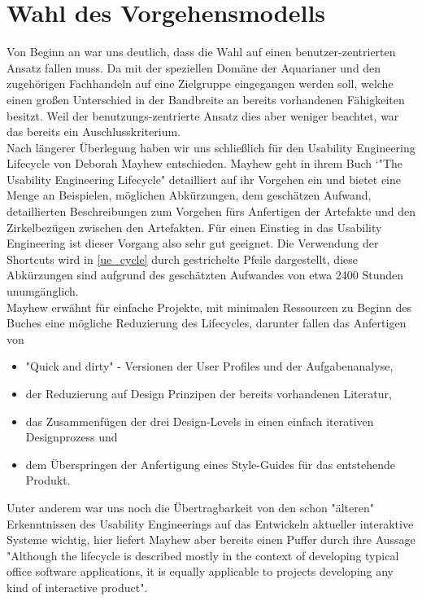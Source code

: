 \chapter{Wahl des Vorgehensmodells}
Von Beginn an war uns deutlich, dass die Wahl auf einen benutzer-zentrierten Ansatz fallen muss. Da mit der speziellen Domäne der Aquarianer und den zugehörigen Fachhandeln auf eine Zielgruppe eingegangen werden soll, welche einen großen Unterschied in der Bandbreite an bereits vorhandenen Fähigkeiten besitzt. Weil der benutzungs-zentrierte Ansatz dies aber weniger beachtet, war das bereits ein Auschlusskriterium.\\
 
Nach längerer Überlegung haben wir uns schließlich für den Usability Engineering Lifecycle von Deborah Mayhew entschieden. Mayhew geht in ihrem Buch `"The Usability Engineering Lifecycle" detailliert auf ihr Vorgehen ein und bietet eine Menge an Beispielen, möglichen Abkürzungen, dem geschätzen Aufwand, detaillierten Beschreibungen zum Vorgehen fürs Anfertigen der Artefakte und den Zirkelbezügen zwischen den Artefakten. Für einen Einstieg in das Usability Engineering ist dieser Vorgang also sehr gut geeignet. 
Die Verwendung der Shortcuts wird in \ref{ue_cycle} durch gestrichelte Pfeile dargestellt, diese Abkürzungen sind aufgrund des geschätzten Aufwandes von etwa 2400 Stunden unumgänglich.\\
Mayhew erwähnt für einfache Projekte, mit minimalen Ressourcen zu Beginn des Buches eine mögliche Reduzierung des Lifecycles\cite[25]{Mayhew:uel}, darunter fallen das Anfertigen von 
\begin{itemize}
 \item "Quick and dirty" - Versionen der User Profiles und der Aufgabenanalyse,
 \item der Reduzierung auf Design Prinzipen der bereits vorhandenen Literatur,
 \item das Zusammenfügen der drei Design-Levels in einen einfach iterativen Designprozess und
 \item dem Überspringen der Anfertigung eines Style-Guides für das entstehende Produkt.
\end{itemize}

Unter anderem war uns noch die Übertragbarkeit von den schon "älteren" Erkenntnissen des Usability Engineerings auf das Entwickeln aktueller interaktive Systeme wichtig, hier liefert Mayhew aber bereits einen Puffer durch ihre Aussage "Although the lifecycle is described mostly in the context of developing typical office software applications, it is equally applicable to projects developing any kind of interactive product".\cite[5]{Mayhew:uel}

